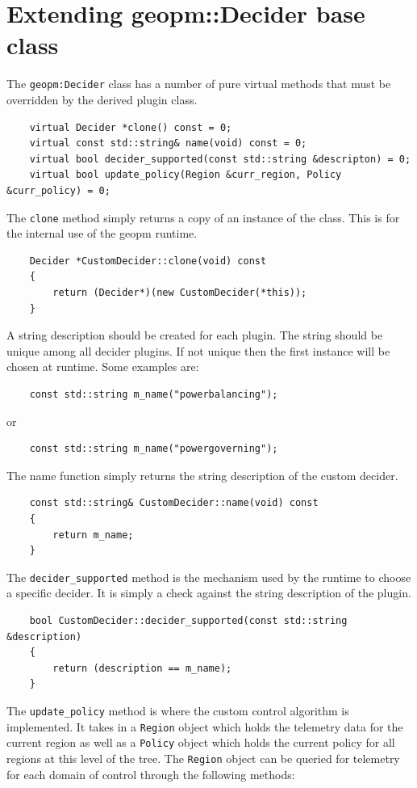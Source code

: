\documentclass[11pt]{article}
\begin{document}
\section{Extending geopm::Decider base class}
The \verb#geopm:Decider# class has a number of pure virtual methods
that must be overridden by the derived plugin class.
\begin{verbatim}
    virtual Decider *clone() const = 0;
    virtual const std::string& name(void) const = 0;
    virtual bool decider_supported(const std::string &descripton) = 0;
    virtual bool update_policy(Region &curr_region, Policy &curr_policy) = 0;
\end{verbatim}
The \verb#clone# method simply returns a copy of an instance of the
class. This is for the internal use of the geopm runtime.
\begin{verbatim}
    Decider *CustomDecider::clone(void) const
    {
        return (Decider*)(new CustomDecider(*this));
    }
\end{verbatim}
A string description should be created for each plugin. The string
should be unique among all decider plugins. If not unique then the
first instance will be chosen at runtime. Some examples are:
\begin{verbatim}
    const std::string m_name("powerbalancing");
\end{verbatim}
or
\begin{verbatim}
    const std::string m_name("powergoverning");
\end{verbatim}
The name function simply returns the string description of the custom
decider.
\begin{verbatim}
    const std::string& CustomDecider::name(void) const
    {
        return m_name;
    }
\end{verbatim}
The \verb#decider_supported# method is the mechanism used by the
runtime to choose a specific decider. It is simply a check against the
string description of the plugin.
\begin{verbatim}
    bool CustomDecider::decider_supported(const std::string &description)
    {
        return (description == m_name);
    }
\end{verbatim}
The \verb#update_policy# method is where the custom control algorithm
is implemented. It takes in a \verb#Region# object which holds the
telemetry data for the current region as well as a \verb#Policy#
object which holds the current policy for all regions at this level of
the tree. The \verb#Region# object can be queried for telemetry for
each domain of control through the following methods:
\end{document}
